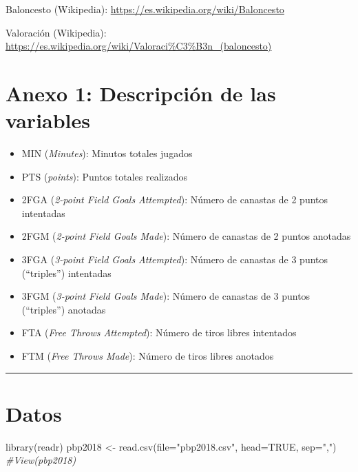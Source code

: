 \documentclass[
]{article}
\newenvironment{Shaded}{\begin{snugshade}}{\end{snugshade}}
\newcommand{\AttributeTok}[1]{\textcolor[rgb]{0.77,0.63,0.00}{#1}}
\newcommand{\CommentTok}[1]{\textcolor[rgb]{0.56,0.35,0.01}{\textit{#1}}}
\newcommand{\ConstantTok}[1]{\textcolor[rgb]{0.00,0.00,0.00}{#1}}
\newcommand{\FunctionTok}[1]{\textcolor[rgb]{0.00,0.00,0.00}{#1}}
\newcommand{\NormalTok}[1]{#1}
\newcommand{\OtherTok}[1]{\textcolor[rgb]{0.56,0.35,0.01}{#1}}
\newcommand{\StringTok}[1]{\textcolor[rgb]{0.31,0.60,0.02}{#1}}
\providecommand{\tightlist}{%
  \setlength{\itemsep}{0pt}\setlength{\parskip}{0pt}}
\begin{document}
Baloncesto (Wikipedia): \url{https://es.wikipedia.org/wiki/Baloncesto}

Valoración (Wikipedia):
\url{https://es.wikipedia.org/wiki/Valoraci\%C3\%B3n_(baloncesto)}

\hypertarget{anexo-1-descripciuxf3n-de-las-variables}{%
\section{Anexo 1: Descripción de las
variables}\label{anexo-1-descripciuxf3n-de-las-variables}}

\begin{itemize}
\tightlist
\item
  MIN (\emph{Minutes}): Minutos totales jugados
\item
  PTS (\emph{points}): Puntos totales realizados
\item
  2FGA (\emph{2-point Field Goals Attempted}): Número de canastas de 2
  puntos intentadas
\item
  2FGM (\emph{2-point Field Goals Made}): Número de canastas de 2 puntos
  anotadas
\item
  3FGA (\emph{3-point Field Goals Attempted}): Número de canastas de 3
  puntos (``triples'') intentadas
\item
  3FGM (\emph{3-point Field Goals Made}): Número de canastas de 3 puntos
  (``triples'') anotadas
\item
  FTA (\emph{Free Throws Attempted}): Número de tiros libres intentados
\item
  FTM (\emph{Free Throws Made}): Número de tiros libres anotados
\end{itemize}

\begin{center}\rule{0.5\linewidth}{0.5pt}\end{center}

\hypertarget{datos}{%
\section{Datos}\label{datos}}

\begin{Shaded}
\begin{Highlighting}[]
\FunctionTok{library}\NormalTok{(readr)}
\NormalTok{pbp2018 }\OtherTok{\textless{}{-}} \FunctionTok{read.csv}\NormalTok{(}\AttributeTok{file=}\StringTok{"pbp2018.csv"}\NormalTok{, }\AttributeTok{head=}\ConstantTok{TRUE}\NormalTok{, }\AttributeTok{sep=}\StringTok{","}\NormalTok{)}
\CommentTok{\#View(pbp2018)}
\end{Highlighting}
\end{Shaded}
\end{document}
